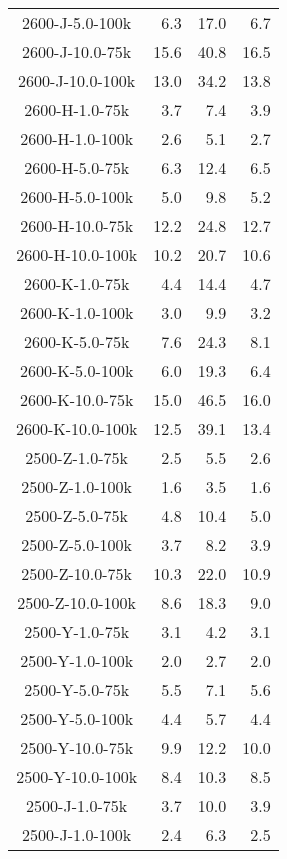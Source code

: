 \begin{longtable}{crrr}
    2600-J-5.0-100k  &    6.3 &   17.0 &    6.7 \\
    2600-J-10.0-75k  &   15.6 &   40.8 &   16.5 \\
    2600-J-10.0-100k &   13.0 &   34.2 &   13.8 \\
    2600-H-1.0-75k   &    3.7 &    7.4 &    3.9 \\
    2600-H-1.0-100k  &    2.6 &    5.1 &    2.7 \\
    2600-H-5.0-75k   &    6.3 &   12.4 &    6.5 \\
    2600-H-5.0-100k  &    5.0 &    9.8 &    5.2 \\
    2600-H-10.0-75k  &   12.2 &   24.8 &   12.7 \\
    2600-H-10.0-100k &   10.2 &   20.7 &   10.6 \\
    2600-K-1.0-75k   &    4.4 &   14.4 &    4.7 \\
    2600-K-1.0-100k  &    3.0 &    9.9 &    3.2 \\
    2600-K-5.0-75k   &    7.6 &   24.3 &    8.1 \\
    2600-K-5.0-100k  &    6.0 &   19.3 &    6.4 \\
    2600-K-10.0-75k  &   15.0 &   46.5 &   16.0 \\
    2600-K-10.0-100k &   12.5 &   39.1 &   13.4 \\
    2500-Z-1.0-75k   &    2.5 &    5.5 &    2.6 \\
    2500-Z-1.0-100k  &    1.6 &    3.5 &    1.6 \\
    2500-Z-5.0-75k   &    4.8 &   10.4 &    5.0 \\
    2500-Z-5.0-100k  &    3.7 &    8.2 &    3.9 \\
    2500-Z-10.0-75k  &   10.3 &   22.0 &   10.9 \\
    2500-Z-10.0-100k &    8.6 &   18.3 &    9.0 \\
    2500-Y-1.0-75k   &    3.1 &    4.2 &    3.1 \\
    2500-Y-1.0-100k  &    2.0 &    2.7 &    2.0 \\
    2500-Y-5.0-75k   &    5.5 &    7.1 &    5.6 \\
    2500-Y-5.0-100k  &    4.4 &    5.7 &    4.4 \\
    2500-Y-10.0-75k  &    9.9 &   12.2 &   10.0 \\
    2500-Y-10.0-100k &    8.4 &   10.3 &    8.5 \\
    2500-J-1.0-75k   &    3.7 &   10.0 &    3.9 \\
    2500-J-1.0-100k  &    2.4 &    6.3 &    2.5 \\

\end{longtable}
